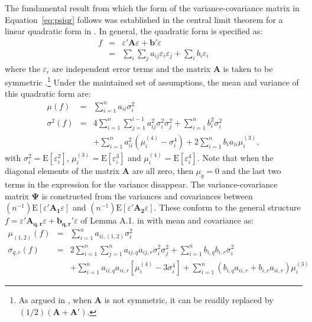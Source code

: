\documentclass{article}
\begin{document}
The fundamental result from which the form of the variance-covariance matrix in 
Equation~\ref{eq:psiqr} follows was established in the central limit theorem
for a linear quadratic form in \citet[pp. 226--227]{KelejianPrucha:01}. In general, the
quadratic form is specified as:
\begin{eqnarray*}
f &=& \varepsilon' \mathbf{A} \varepsilon + \mathbf{b}' \varepsilon\\
   &=& \sum_i \sum_j a_{ij} \varepsilon_i \varepsilon_j + \sum_i b_i \varepsilon_i
\end{eqnarray*}
where the $\varepsilon_i$ are independent error terms and the matrix $\mathbf{A}$ is taken to be symmetric \citep[for the full set of assumptions, see][]{KelejianPrucha:01}.\footnote{As argued in 
 \citet[footnote 10]{KelejianPrucha:01}, when $\mathbf{A}$ is not symmetric,
 it can be readily replaced by $(1/2) (\mathbf{A} + \mathbf{A'} )$.} Under the maintained
 set of assumptions, the mean and variance of this quadratic form are:
 \begin{eqnarray*}
 \mu(f) &=& \sum_{i = 1}^n a_{ii} \sigma_i^2\\
 \sigma^2(f) &=& 4 \sum_{i = 1}^{n} \sum_{j = 1}^{i - 1} a_{ij}^2 \sigma^2_i \sigma^2_j 
    + \sum_{i = 1}^n b_i^2 \sigma^2_i\\
    && + \sum_{i = 1}^n a_{ii}^2 ( \mu_i^{(4)} - \sigma_i^4 ) + 2 \sum_{i = 1}^n b_i a_{ii} \mu_i^{(3)},
 \end{eqnarray*}
with $\sigma^2_i = \mbox{E}[\varepsilon_i^2]$, $\mu_i^{(3)} = \mbox{E}[\varepsilon_i^3]$
and $\mu_i^{(4)} = \mbox{E}[\varepsilon_i^4]$. Note that when the diagonal elements of the
matrix $\mathbf{A}$ are all zero, then $\mu_q = 0$ and the last two terms in the
expression for the variance disappear. The variance-covariance matrix $\mathbf{\Psi}$ is
constructed from the variances and covariances between $(n^{-1}) \mbox{E}[\varepsilon' \mathbf{A_1} \varepsilon]$ and $(n^{-1}) \mbox{E}[\varepsilon' \mathbf{A_2} \varepsilon]$. These conform to the
general structure 
$f = \varepsilon' \mathbf{A_{q,r}} \varepsilon + \mathbf{b_{q,r}}' \varepsilon$ of Lemma A.1. in \citet[pp. 62--63]{KelejianPrucha:10} with mean and
covariance as:
\begin{eqnarray*}
\mu_{(1,2)}(f) &=& \sum_{i = 1}^n a_{ii,(1,2)} \sigma_i^2\\
\sigma_{q,r}(f) &=& 2 \sum_{i = 1}^{n} \sum_{j = 1}^{n} a_{ij,q} a_{ij,r} \sigma_i^2 \sigma_j^2  + \sum_{i = 1}^{n} b_{i,q} b_{i,r} \sigma^2_i\\
  && + \sum_{i=1}^n a_{ii,q} a_{ii,r} [ \mu_i^{(4)} - 3 \sigma^4_i ]
 + \sum_{i=1}^n (b_{i,q} a_{ii,r} + b_{i,r} a_{ii,r} )\mu_i^{(3)}
\end{eqnarray*}
\end{document}

